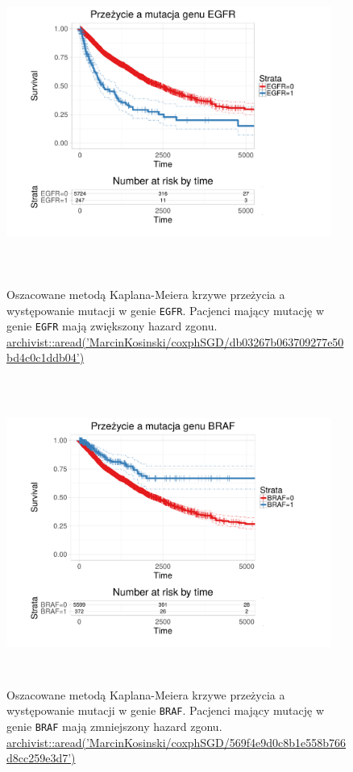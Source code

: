 \begin{figure}[!ht]
\centering
\includegraphics[width=0.95\textwidth, height = 280pt]{Obrazki/analiza/EGFR_surv.pdf}
\caption{\label{fig:surv1} Oszacowane metodą Kaplana-Meiera krzywe przeżycia a występowanie mutacji w genie \texttt{EGFR}. Pacjenci mający mutację w genie \texttt{EGFR} mają zwiększony hazard zgonu. \\
\href{https://github.com/MarcinKosinski/coxphSGD/blob/master/gallery/db03267b063709277e50bd4c0c1ddb04.rda?raw=true}{archivist::aread('MarcinKosinski/coxphSGD/db03267b063709277e50bd4c0c1ddb04')}}
\ \\
\includegraphics[width=0.95\textwidth, height = 260pt]{Obrazki/analiza/BRAF_surv.pdf}
\caption{\label{fig:surv2} Oszacowane metodą Kaplana-Meiera krzywe przeżycia a występowanie mutacji w genie \texttt{BRAF}. Pacjenci mający mutację w genie \texttt{BRAF} mają zmniejszony hazard zgonu. \\
\href{https://github.com/MarcinKosinski/coxphSGD/blob/master/gallery/569f4e9d0c8b1e558b766d8cc259e3d7.rda?raw=true}{archivist::aread('MarcinKosinski/coxphSGD/569f4e9d0c8b1e558b766d8cc259e3d7')}}
\end{figure}
